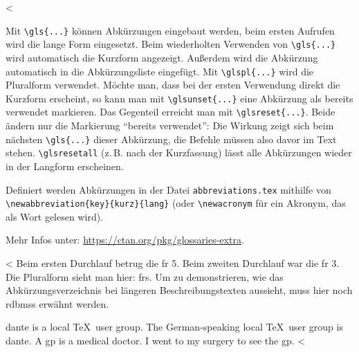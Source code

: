 <%

Mit \verb+\gls{...}+ können Abkürzungen eingebaut werden, beim ersten Aufrufen wird die lange Form eingesetzt.
Beim wiederholten Verwenden von \verb+\gls{...}+ wird automatisch die Kurzform angezeigt.
Außerdem wird die Abkürzung automatisch in die Abkürzungsliste eingefügt.
Mit \verb+\glspl{...}+ wird die Pluralform verwendet.
Möchte man, dass bei der ersten Verwendung direkt die Kurzform erscheint, so kann man mit \verb+\glsunset{...}+ eine Abkürzung als bereits verwendet markieren.
Das Gegenteil erreicht man mit \verb+\glsreset{...}+.
Beide ändern nur die Markierung \enquote{bereits verwendet}: Die Wirkung zeigt sich beim nächsten \verb+\gls{...}+ dieser Abkürzung, die Befehle müssen also davor im Text stehen.
\verb+\glsresetall+ (z.\,B. nach der Kurzfassung) lässt alle Abkürzungen wieder in der Langform erscheinen.

Definiert werden Abkürzungen in der Datei \verb+abbreviations.tex+ mithilfe von \verb+\newabbreviation{key}{kurz}{lang}+ (oder \verb+\newacronym+ für ein Akronym, das als Wort gelesen wird).

Mehr Infos unter: \url{https://ctan.org/pkg/glossaries-extra}.

<%
Beim ersten Durchlauf betrug die \gls{fr} 5.
Beim zweiten Durchlauf war die \gls{fr} 3.
Die Pluralform sieht man hier: \glspl{fr}.
Um zu demonstrieren, wie das Abkürzungsverzeichnis bei längeren Beschreibungstexten aussieht, muss hier noch \glspl{rdbms} erwähnt werden.

\gls{dante} is a local \TeX\ user group.
The German-speaking local \TeX\ user group is \gls{dante}.
A \gls{gp} is a medical doctor.
I went to my surgery to see the \gls{gp}.
<%
